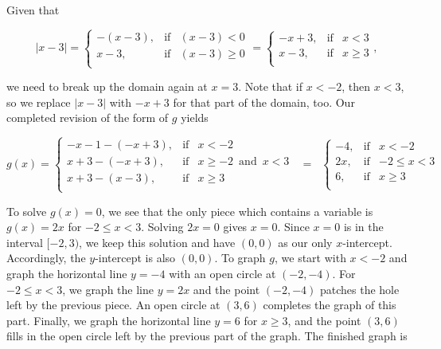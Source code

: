 \begin{ex}
\begin{enumerate}
Given that 

\[ |x-3| =\left\{ \begin{array}{rcl} -(x-3), & \mbox{if} & (x-3) <0  \\ x-3, & \mbox{if} & (x-3) \geq 0 \\ \end{array} \right. = \left\{ \begin{array}{rcl} -x+3, & \mbox{if} & x<3 \\ x-3, & \mbox{if} & x \geq 3 \\ \end{array} \right., \]


we need to break up the domain again at $x=3$.  Note that if $x < -2$, then $x < 3$, so we replace $|x-3|$ with $-x+3$ for that part of the domain, too.  Our completed revision of the form of $g$ yields 

\setlength{\extrarowheight}{2pt}
\[ g(x) = \left\{ \begin{array}{rcl} 
-x-1 - (-x+3), & \mbox{if} & x<-2 \\
x+3-(-x+3), & \mbox{if} & x \geq -2 \, \mbox{ and } \, x < 3 \\
x+3 - (x-3), & \mbox{if} & x \geq 3  \\  \end{array} \right. \;\; = \;\; \left\{ \begin{array}{rcl} -4, & \mbox{if} & x<-2 \\                                                                                    2x, & \mbox{if} &  -2 \leq x < 3 \\
                                                                                6, & \mbox{if} & x \geq 3  \\                                                                                 \end{array} \right. \]

\end{enumerate}

To solve $g(x)=0$, we see that the only piece which contains a variable is $g(x) = 2x$ for $-2 \leq x < 3$.  Solving $2x=0$ gives $x=0$.  Since $x=0$ is in the interval $[-2,3)$, we keep this solution and have $(0,0)$ as our only $x$-intercept.  Accordingly, the $y$-intercept is also $(0,0)$.  To graph $g$, we start with $x < -2$ and graph the horizontal line $y=-4$ with an open circle  at $(-2,-4)$. For $-2 \leq x < 3$, we graph the line $y=2x$ and the point $(-2,-4)$ patches the hole left by the previous piece.  An open circle at $(3,6)$ completes the graph of this part.  Finally, we graph the horizontal line $y=6$ for $x \geq 3$, and the point $(3,6)$ fills in the open circle left by the previous part of the graph.  The finished graph is 


\end{ex}
